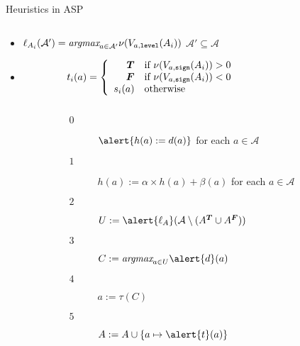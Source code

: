 \begin{block}{Heuristics in ASP}
\begin{columns}
\begin{column}{.98\linewidth}
\begin{itemize}
\bigskip
  \item {} \quad
    \(
    \ell_{A_i}(\mathcal{A}')=\textit{argmax}_{a\in\mathcal{A}'}\nu(V_{a,\mathtt{level}}(A_i))
    \)
    \qquad
    $\mathcal{A}'\subseteq\mathcal{A}$

\fourskip

  \item {}
    \begin{align*}
      t_i(a)&=
      \left\{
        \begin{array}{rl}
          \boldsymbol{T} &\text{if }
          \nu(V_{a,\mathtt{sign}}(A_i))>0
          \\
          \boldsymbol{F}&\text{if }
          \nu(V_{a,\mathtt{sign}}(A_i))<0
          \\
          s_i(a)&\text{otherwise}
        \end{array}
      \right.\qquad\qquad\qquad\quad\;
    \end{align*}
  \end{itemize}

\end{column} \end{columns}


\bigskip  \bigskip %
{}

\begin{columns} \begin{column}{.02\linewidth}\end{column}
\begin{column}{.98\linewidth}


  \begin{description}%
  \item [$0 \ $] $\alert{h(a) := d(a)}$                         \hfill for each $a\in\mathcal{A}\qquad$
  \item [$1 \ $] $h(a) := \alpha\times h(a) + \beta(a)$ \hfill for each $a\in\mathcal{A}\qquad$
  \item [$2 \ $] $U:=\alert{\ell_{\ass}}(\mathcal{A}\setminus (\tlits{\ass}\cup\flits{\ass}))$
  \item [$3 \ $] $C:= \textit{argmax}_{a\in U}\alert{d}(a)$
  \item [$4 \ $] $a:= \tau(C)$
  \item [$5 \ $] $\ass := \ass\cup\{a\mapsto\alert{t}(a)\}$

 \end{description}
\end{column} \end{columns}

\end{block}

